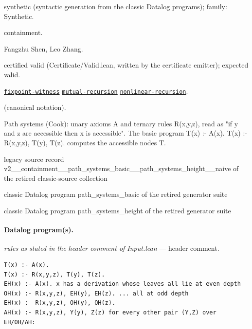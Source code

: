 \documentclass[10pt]{article}
\begin{document}
\begin{description}[leftmargin=2.6cm,style=nextline,itemsep=1pt]

\item[Category] synthetic (syntactic generation from the classic Datalog programs); family: Synthetic.

\item[Kind] containment.

\item[Contributors] Fangzhu Shen, Leo Zhang.

\item[Status] certified valid (Certificate/Valid.lean, written by the certificate emitter); expected valid.

\item[Tags] \hyperref[tag:fixpoint-witness]{\texttt{fixpoint-witness}} \hyperref[tag:mutual-recursion]{\texttt{mutual-recursion}} \hyperref[tag:nonlinear-recursion]{\texttt{nonlinear-recursion}}.

\item[Input]  (canonical notation).

\item[Summary] Path systems (Cook): unary axioms A and ternary rules R(x,y,z), read as "if y and z are accessible then x is accessible". The basic program T(x) :- A(x). T(x) :- R(x,y,z), T(y), T(z). computes the accessible nodes T.

\item[Sources] {\raggedright legacy source record v2\_\_containment\_\_path\_systems\_basic\_\_path\_systems\_height\_\_naive of the retired classic-source collection \par classic Datalog program path\_systems\_basic of the retired generator suite \par classic Datalog program path\_systems\_height of the retired generator suite\par}

\end{description}

\paragraph{Datalog program(s).}

{\raggedright\textit{rules as stated in the header comment of Input.lean} --- header comment.\par}

\begin{Verbatim}[fontsize=\scriptsize,breaklines=true,breakanywhere=true,frame=single,framesep=1.5mm]
T(x) :- A(x).
T(x) :- R(x,y,z), T(y), T(z).
EH(x) :- A(x). x has a derivation whose leaves all lie at even depth
OH(x) :- R(x,y,z), EH(y), EH(z). ... all at odd depth
EH(x) :- R(x,y,z), OH(y), OH(z).
AH(x) :- R(x,y,z), Y(y), Z(z) for every other pair (Y,Z) over EH/OH/AH:
\end{Verbatim}
\end{document}
